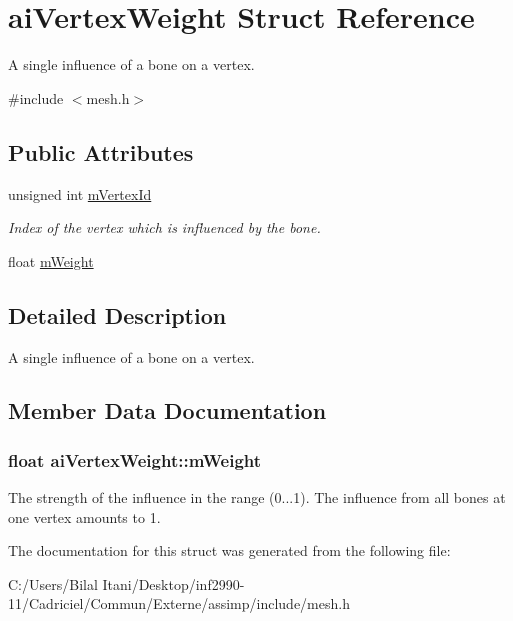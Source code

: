 \hypertarget{structai_vertex_weight}{}\section{ai\+Vertex\+Weight Struct Reference}
\label{structai_vertex_weight}


A single influence of a bone on a vertex.  




{\ttfamily \#include $<$mesh.\+h$>$}

\subsection*{Public Attributes}
\begin{DoxyCompactItemize}
\item 
unsigned int \hyperlink{structai_vertex_weight_af6269cf6a0f02e5ae870a72046d58f4f}{m\+Vertex\+Id}\hypertarget{structai_vertex_weight_af6269cf6a0f02e5ae870a72046d58f4f}{}\label{structai_vertex_weight_af6269cf6a0f02e5ae870a72046d58f4f}

\begin{DoxyCompactList}\small\item\em Index of the vertex which is influenced by the bone. \end{DoxyCompactList}\item 
float \hyperlink{structai_vertex_weight_abab9c49baabc2cafef9ac840f59e61b8}{m\+Weight}
\end{DoxyCompactItemize}


\subsection{Detailed Description}
A single influence of a bone on a vertex. 

\subsection{Member Data Documentation}
\subsubsection[{\texorpdfstring{m\+Weight}{mWeight}}]{\setlength{\rightskip}{0pt plus 5cm}float ai\+Vertex\+Weight\+::m\+Weight}\hypertarget{structai_vertex_weight_abab9c49baabc2cafef9ac840f59e61b8}{}\label{structai_vertex_weight_abab9c49baabc2cafef9ac840f59e61b8}
The strength of the influence in the range (0...1). The influence from all bones at one vertex amounts to 1. 

The documentation for this struct was generated from the following file\+:\begin{DoxyCompactItemize}
\item 
C\+:/\+Users/\+Bilal Itani/\+Desktop/inf2990-\/11/\+Cadriciel/\+Commun/\+Externe/assimp/include/mesh.\+h\end{DoxyCompactItemize}
